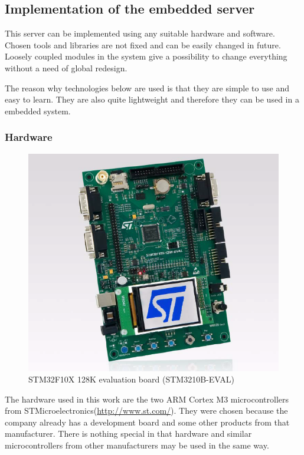 \newpage
\subsection{Implementation of the embedded server}
\label{sec:embedded_service_impl}
This server can be implemented using any suitable hardware and software.
Chosen tools and libraries are not fixed and can be easily changed in
future.
Loosely coupled modules in the system give a possibility to change everything
without a need of global redesign.

The reason why technologies below are used is that they are simple to use and
easy to learn. They are also quite lightweight and therefore they can be used in
a embedded system.

\subsubsection{Hardware}
\label{sec:hardware}
\begin{center}
 \begin{figure}[h]
	\includegraphics[height=0.5\textheight]{../images/implementation/embedded_server/stm3210b-eval.png}
	\caption{STM32F10X 128K evaluation board (STM3210B-EVAL)
	\cite{stm_eval_board_manual}}
	\label{fig:stm_eval_board}
 \end{figure}
\end{center}

The hardware used in this work are the two \gls{ARM} Cortex M3 microcontrollers from
STMicroelectronics(\url{http://www.st.com/}). They were chosen because the
company already has a development board  and some other products from that
manufacturer. There is nothing special in that hardware and similar
microcontrollers from other manufacturers may be used in the same way.

